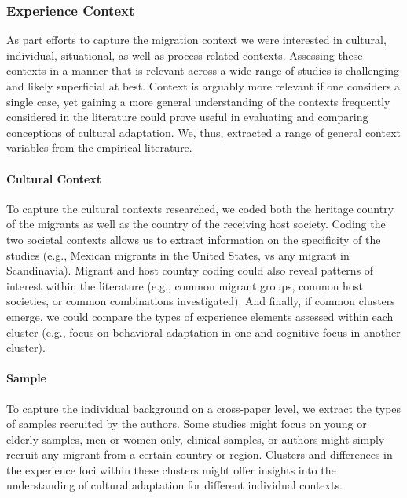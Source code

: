 \documentclass[man, 12pt, a4paper]{apa7}
\begin{document}
\subsubsection{Experience Context}
As part efforts to capture the migration context we were interested in cultural, individual, situational, as well as process related contexts. Assessing these contexts in a manner that is relevant across a wide range of studies is challenging and likely superficial at best. Context is arguably more relevant if one considers a single case, yet gaining a more general understanding of the contexts frequently considered in the literature could prove useful in evaluating and comparing conceptions of cultural adaptation. We, thus, extracted a range of general context variables from the empirical literature.

\paragraph{Cultural Context}
To capture the cultural contexts researched, we coded both the heritage country of the migrants as well as the country of the receiving host society. Coding the two societal contexts allows us to extract information on the specificity of the studies (e.g., Mexican migrants in the United States, vs any migrant in Scandinavia). Migrant and host country coding could also reveal patterns of interest within the literature (e.g., common migrant groups, common host societies, or common combinations investigated). And finally, if common clusters emerge, we could compare the types of experience elements assessed within each cluster (e.g., focus on behavioral adaptation in one and cognitive focus in another cluster). 

\paragraph{Sample}
To capture the individual background on a cross-paper level, we extract the types of samples recruited by the authors. Some studies might focus on young or elderly samples, men or women only, clinical samples, or authors might simply recruit any migrant from a certain country or region. Clusters and differences in the experience foci within these clusters might offer insights into the understanding of cultural adaptation for different individual contexts.
\end{document}
